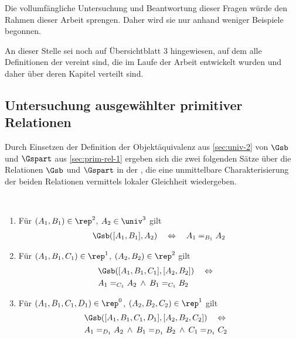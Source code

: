     Die vollumfängliche Untersuchung und Beantwortung dieser Fragen würde den Rahmen dieser Arbeit sprengen. 
    Daher wird sie nur anhand weniger Beispiele begonnen.
    
    An dieser Stelle sei noch auf Übersichtblatt 3 hingewiesen, auf dem alle Definitionen der \strukt vereint sind, die im Laufe der Arbeit entwickelt wurden und daher über deren Kapitel verteilt sind.

\subsection{Untersuchung ausgewählter primitiver Relationen}
    Durch Einsetzen der Definition der Objektäquivalenz aus \ref{sec:univ-2} von $\Gsb$ und $\Gspart$ aus \ref{sec:prim-rel-1} ergeben sich die zwei folgenden Sätze über die Relationen $\Gsb$ und $\Gspart$ in der \strukt, die eine unmittelbare Charakterisierung der beiden Relationen vermittels lokaler Gleichheit wiedergeben.

    \begin{satz}\ \vspace{0pt}

        \begin{enumerate}
            \item Für $(A_1,B_1) \in \rep^2$, $A_2 \in \univ^3$ gilt 
                \begin{align*}
                    \Gsb([A_1,B_1],A_2) 
                    \quad \Leftrightarrow \quad 
                    A_1 =_{B_1} A_2
                \end{align*}
            \item Für $(A_1,B_1,C_1) \in \rep^1$, $(A_2,B_2) \in \rep^2$ gilt 
                \begin{align*}
                    &\Gsb([A_1,B_1,C_1],[A_2,B_2]) 
                    \quad \Leftrightarrow \quad\\
                    &A_1 =_{C_1} A_2 \:\land\: B_1 =_{C_1} B_2
                \end{align*}
            \item Für $(A_1,B_1,C_1,D_1) \in \rep^0$, $(A_2,B_2,C_2) \in \rep^1$ gilt 
                \begin{align*}
                    &\Gsb([A_1,B_1,C_1,D_1],[A_2,B_2,C_2]) 
                    \quad \Leftrightarrow \quad\\ 
                    &A_1 =_{D_1} A_2 \:\land\: B_1 =_{D_1} B_2 \:\land\: C_1 =_{D_1} C_2
                \end{align*}
        \end{enumerate}
        
    \end{satz}
    
